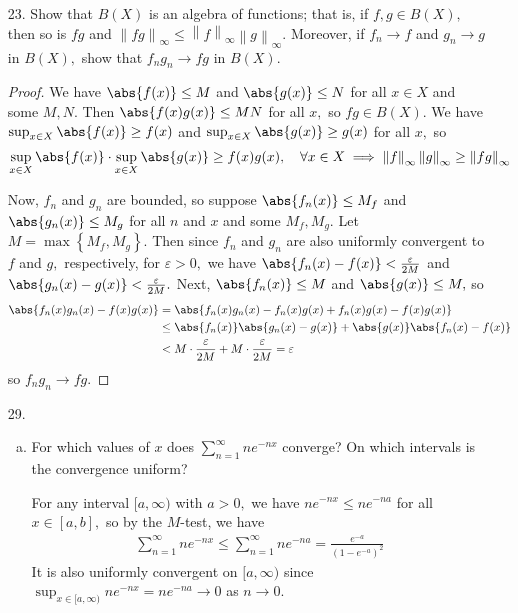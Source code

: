 \documentclass{article}
\begin{document}
\begin{itemize}
	\item[23.] Show that $B(X)$ is an algebra of functions; that is, if $f, g\in B(X),$ then so is $fg$ and $\left\lVert fg \right\rVert_\infty\le \left\lVert f \right\rVert_\infty\left\lVert g \right\rVert_\infty.$ Moreover, if $f_n\to f$ and $g_n\to g$ in $B(X),$ show that $f_ng_n\to fg$ in $B(X).$ 
		\begin{proof}
			We have $\abs{f(x)}\le M$ and $\abs{g(x)}\le N$ for all $x\in X$ and some $M, N.$ Then $\abs{f(x)g(x)}\le MN$ for all $x,$ so $fg\in B(X).$ We have $\sup_{x\in X} \abs{f(x)}\ge f(x)$ and $\sup_{x\in X}\abs{g(x)}\ge g(x)$ for all $x,$ so
			\begin{align*}
				\sup_{x\in X}\abs{f(x)} \cdot \sup_{x\in X} \abs{g(x)}\ge f(x)g(x), \quad\forall x\in X \implies \left\lVert f \right\rVert_\infty \left\lVert g \right\rVert_\infty \ge \left\lVert fg \right\rVert_\infty
			\end{align*}

			Now, $f_n$ and $g_n$ are bounded, so suppose $\abs{f_n(x)}\le M_f$ and $\abs{g_n(x)}\le M_g$ for all $n$ and $x$ and some $M_f, M_g.$ Let $M=\max\left\{ M_f, M_g \right\}.$ Then since $f_n$ and $g_n$ are also uniformly convergent to $f$ and $g,$ respectively, for $\varepsilon>0,$ we have $\abs{f_n(x)-f(x)}<\frac{\varepsilon}{2M}$ and $\abs{g_n(x)-g(x)}<\frac{\varepsilon}{2M}.$ Next, $\abs{f_n(x)}\le M$ and $\abs{g(x)}\le M,$ so
			\begin{align*}
				\abs{f_n(x)g_n(x)-f(x)g(x)} &= \abs{f_n(x)g_n(x)-f_n(x)g(x)+f_n(x)g(x)-f(x)g(x)} \\
				&\le \abs{f_n(x)}\abs{g_n(x)-g(x)} + \abs{g(x)}\abs{f_n(x)-f(x)} \\
				&< M\cdot \frac{\varepsilon}{2M} + M\cdot \frac{\varepsilon}{2M} = \varepsilon
			\end{align*}
			so $f_ng_n\to fg.$
		\end{proof}

	\item[29.]
		\begin{enumerate}[(a)]
			\item For which values of $x$ does $\sum_{n=1}^{\infty} ne^{-nx}$ converge? On which intervals is the convergence uniform?
				\begin{soln}
					For any interval $[a, \infty)$ with $a>0,$ we have $ne^{-nx}\le ne^{-na}$ for all $x\in [a, b],$ so by the $M$-test, we have
					\begin{align*}
						\sum_{n=1}^{\infty}ne^{-nx}\le \sum_{n=1}^{\infty} ne^{-na} = \frac{e^{-a}}{(1-e^{-a})^2}
					\end{align*}
					It is also uniformly convergent on $[a, \infty)$ since $\sup_{x\in [a, \infty)} ne^{-nx} = ne^{-na} \to 0$ as $n\to 0.$
				\end{soln}


\end{enumerate}
\end{itemize}
\end{document}
